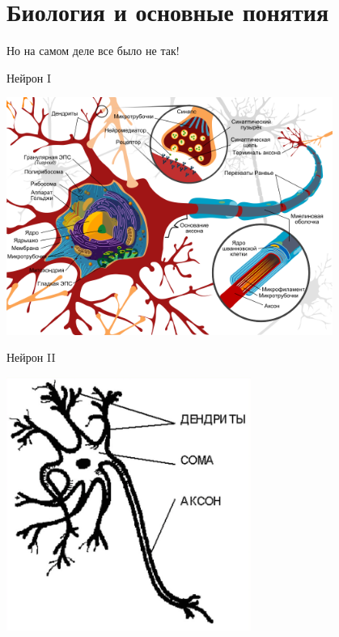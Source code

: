 \documentclass[14pt, fleqn, xcolor={dvipsnames, table}]{beamer}
\begin{document}
\section{Биология и основные понятия} %
\begin{frame}{}
\begin{center}
\Huge
Но на самом деле все было не так!
\end{center}
\end{frame}

\begin{frame}{Нейрон I}
\begin{center}
\includegraphics[width=0.8\textwidth]{normal_neuron}
\end{center}
\end{frame}

\begin{frame}{Нейрон II}
\begin{center}
\includegraphics[width=0.6\textwidth]{neuron_simple}
\end{center}
\end{frame}
\end{document}
